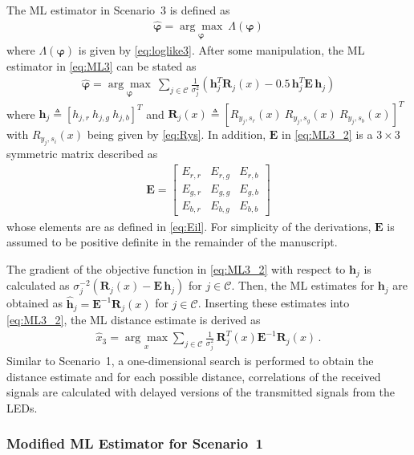 \documentclass[10pt,twocolumn]{IEEEtran}
\newcommand{\Rj}{{\boldsymbol{R}}_j}
\newcommand{\RjT}{{\boldsymbol{R}}_j^T}
\newcommand{\EE}{{\boldsymbol{E}}}
\newcommand{\hj}{{\boldsymbol{h}}_j}
\newcommand{\hjT}{{\boldsymbol{h}}_j^T}
\newcommand{\hjh}{{\widehat{\boldsymbol{h}}}_j}
\newcommand{\bvp}{{\boldsymbol{\varphi}}}
\newcommand{\mtC}{{\mathcal{C}}}
\begin{document}
The ML estimator in Scenario~3 is defined as
\begin{gather}\label{eq:ML3}
\widehat{\bvp}=\underset{\bvp}{\arg\max}~\Lambda(\bvp)
\end{gather}
where $\Lambda(\bvp)$ is given by \eqref{eq:loglike3}. After some manipulation, the ML estimator in \eqref{eq:ML3} can be stated as
\begin{gather}\label{eq:ML3_2}
\widehat{\bvp}=\underset{\bvp}{\arg\max}~
\sum_{j\in\mtC}\frac{1}{\sigma_j^2}
\left(\hjT\Rj(x)-0.5\,\hjT\EE\,\hj\right)
\end{gather}
where $\hj\triangleq[h_{j,r}~h_{j,g}~h_{j,b}]^T$ and $\Rj(x)\triangleq[R_{y_j,s_r}(x)~R_{y_j,s_g}(x)~R_{y_j,s_b}(x)]^T$ with $R_{y_j,s_i}(x)$ being given by \eqref{eq:Rys}. In addition, $\EE$ in \eqref{eq:ML3_2} is a $3\times 3$ symmetric matrix described as
\begin{gather}\label{eq:Ematrix}
\EE=\begin{bmatrix}
E_{r,r}&E_{r,g}&E_{r,b}\\
E_{g,r}&E_{g,g}&E_{g,b}\\
E_{b,r}&E_{b,g}&E_{b,b}
\end{bmatrix}
\end{gather}
whose elements are as defined in \eqref{eq:Eil}. For simplicity of the derivations, $\EE$ is assumed to be positive definite in the remainder of the manuscript.

The gradient of the objective function in \eqref{eq:ML3_2} with respect to $\hj$ is calculated as $\sigma_j^{-2}(\Rj(x)-\EE\,\hj)$ for $j\in\mtC$. Then, the ML estimates for $\hj$ are obtained as $\hjh=\EE^{-1}\Rj(x)$ for $j\in\mtC$. Inserting these estimates into \eqref{eq:ML3_2}, the ML distance estimate is derived as
\begin{gather}\label{eq:ML3_3}
\widehat{x}_3=\underset{x}{\arg\max}\sum_{j\in\mtC}
\frac{1}{\sigma_j^2}\,\RjT(x)\EE^{-1}\Rj(x)\,.
\end{gather}
Similar to Scenario~1, a one-dimensional search is performed to obtain the distance estimate and for each possible distance, correlations of the received signals are calculated with delayed versions of the transmitted signals from the LEDs.

\subsubsection{Modified ML Estimator for Scenario~1}\label{sec:ML4}
\end{document}
